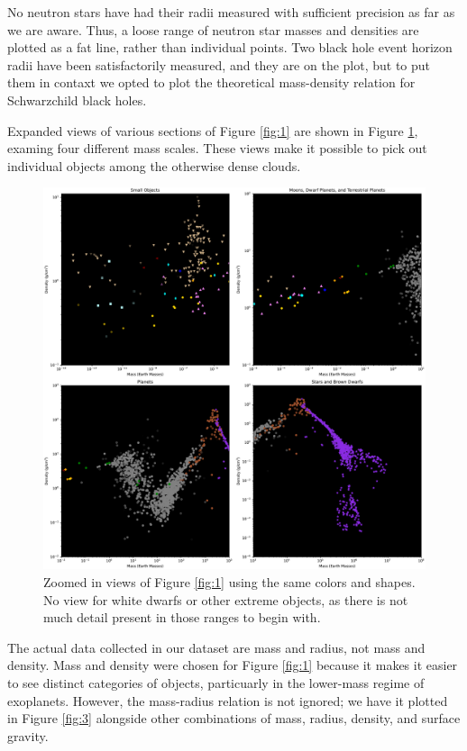 \documentclass[twocolumn,linenumbers]{aastex631}
\begin{document}
No neutron stars have had their radii measured with sufficient precision as far as we are aware. Thus, a loose range of neutron star masses and densities are plotted as a fat line, rather than individual points. Two black hole event horizon radii have been satisfactorily measured, and they are on the plot, but to put them in contaxt we opted to plot the theoretical mass-density relation for Schwarzchild black holes.

Expanded views of various sections of Figure \ref{fig:1} are shown in Figure \ref{fig:2}, examing four different mass scales. These views make it possible to pick out individual objects among the otherwise dense clouds.  

\begin{figure}[htbp]
\centering
\includegraphics[scale = 0.35]{ZoomViews.pdf}
\centering
\caption{Zoomed in views of Figure \ref{fig:1} using the same colors and shapes. No view for white dwarfs or other extreme objects, as there is not much detail present in those ranges to begin with.}
\label{fig:2}
\end{figure}

The actual data collected in our dataset are mass and radius, not mass and density. Mass and density were chosen for Figure \ref{fig:1} because it makes it easier to see distinct categories of objects, particuarly in the lower-mass regime of exoplanets. However, the mass-radius relation is not ignored; we have it plotted in Figure \ref{fig:3} alongside other combinations of mass, radius, density, and surface gravity. 
\end{document}
